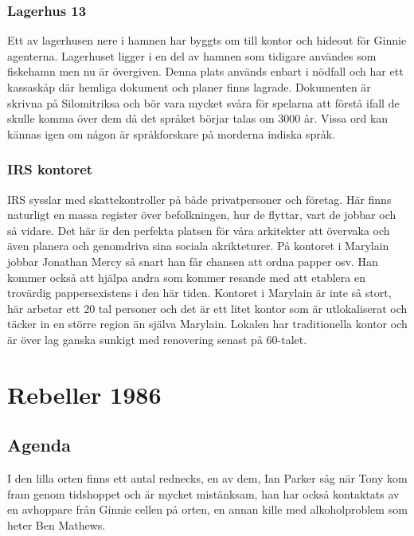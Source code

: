 \subsubsection{Lagerhus 13}
Ett av lagerhusen nere i hamnen har byggts om till kontor och hideout för Ginnie agenterna. Lagerhuset ligger i en del av hamnen som tidigare användes som fiskehamn men nu är övergiven. Denna plats används enbart i nödfall och har ett kassaskåp där hemliga dokument och planer finns lagrade. Dokumenten är skrivna på Silomitriksa och bör vara mycket svåra för spelarna att förstå ifall de skulle komma över dem då det språket börjar talas om 3000 år. Vissa ord kan kännas igen om någon är språkforskare på morderna indiska språk.
\subsubsection{IRS kontoret}
IRS sysslar med skattekontroller på både privatpersoner och företag. Här finns naturligt en massa register över befolkningen, hur de flyttar, vart de jobbar och så vidare. Det här är den perfekta platsen för våra arkitekter att övervaka och även planera och genomdriva sina sociala akrikteturer. På kontoret i Marylain jobbar Jonathan Mercy så snart han får chansen att ordna papper osv. Han kommer också att hjälpa andra som kommer resande med att etablera en trovärdig pappersexistens i den här tiden. Kontoret i Marylain är inte så stort, här arbetar ett 20 tal personer och det är ett litet kontor som är utlokaliserat och täcker in en större region än själva Marylain. Lokalen har traditionella kontor och är över lag ganska sunkigt med renovering senast på 60-talet.
\section{Rebeller 1986}
\subsection{Agenda}
I den lilla orten finns ett antal rednecks, en av dem, Ian Parker såg när Tony kom fram genom tidshoppet och är mycket mistänksam, han har också kontaktats av en avhoppare från Ginnie cellen på orten, en annan kille med alkoholproblem som heter Ben Mathews.
